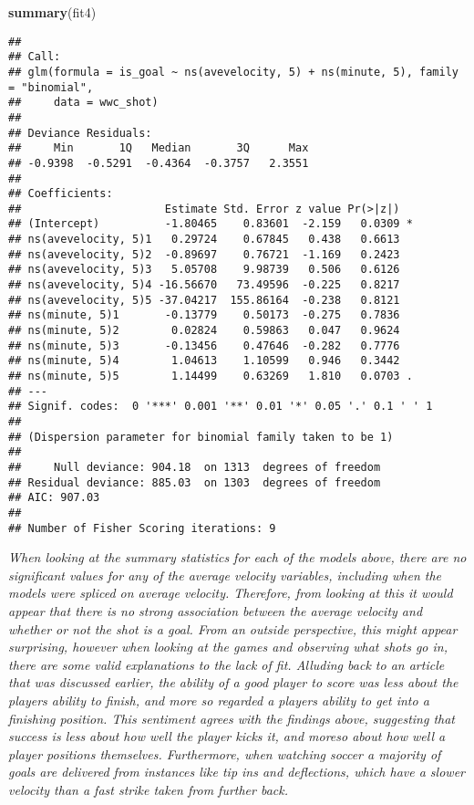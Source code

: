 \documentclass[]{article}
\newenvironment{Shaded}{\begin{snugshade}}{\end{snugshade}}
\newcommand{\KeywordTok}[1]{\textcolor[rgb]{0.13,0.29,0.53}{\textbf{#1}}}
\newcommand{\NormalTok}[1]{#1}
\begin{document}
\begin{Shaded}
\begin{Highlighting}[]
\KeywordTok{summary}\NormalTok{(fit4)}
\end{Highlighting}
\end{Shaded}

\begin{verbatim}
## 
## Call:
## glm(formula = is_goal ~ ns(avevelocity, 5) + ns(minute, 5), family = "binomial", 
##     data = wwc_shot)
## 
## Deviance Residuals: 
##     Min       1Q   Median       3Q      Max  
## -0.9398  -0.5291  -0.4364  -0.3757   2.3551  
## 
## Coefficients:
##                      Estimate Std. Error z value Pr(>|z|)  
## (Intercept)          -1.80465    0.83601  -2.159   0.0309 *
## ns(avevelocity, 5)1   0.29724    0.67845   0.438   0.6613  
## ns(avevelocity, 5)2  -0.89697    0.76721  -1.169   0.2423  
## ns(avevelocity, 5)3   5.05708    9.98739   0.506   0.6126  
## ns(avevelocity, 5)4 -16.56670   73.49596  -0.225   0.8217  
## ns(avevelocity, 5)5 -37.04217  155.86164  -0.238   0.8121  
## ns(minute, 5)1       -0.13779    0.50173  -0.275   0.7836  
## ns(minute, 5)2        0.02824    0.59863   0.047   0.9624  
## ns(minute, 5)3       -0.13456    0.47646  -0.282   0.7776  
## ns(minute, 5)4        1.04613    1.10599   0.946   0.3442  
## ns(minute, 5)5        1.14499    0.63269   1.810   0.0703 .
## ---
## Signif. codes:  0 '***' 0.001 '**' 0.01 '*' 0.05 '.' 0.1 ' ' 1
## 
## (Dispersion parameter for binomial family taken to be 1)
## 
##     Null deviance: 904.18  on 1313  degrees of freedom
## Residual deviance: 885.03  on 1303  degrees of freedom
## AIC: 907.03
## 
## Number of Fisher Scoring iterations: 9
\end{verbatim}

\emph{When looking at the summary statistics for each of the models
above, there are no significant values for any of the average velocity
variables, including when the models were spliced on average velocity.
Therefore, from looking at this it would appear that there is no strong
association between the average velocity and whether or not the shot is
a goal. From an outside perspective, this might appear surprising,
however when looking at the games and observing what shots go in, there
are some valid explanations to the lack of fit. Alluding back to an
article that was discussed earlier, the ability of a good player to
score was less about the players ability to finish, and more so regarded
a players ability to get into a finishing position. This sentiment
agrees with the findings above, suggesting that success is less about
how well the player kicks it, and moreso about how well a player
positions themselves. Furthermore, when watching soccer a majority of
goals are delivered from instances like tip ins and deflections, which
have a slower velocity than a fast strike taken from further back.}
\end{document}
